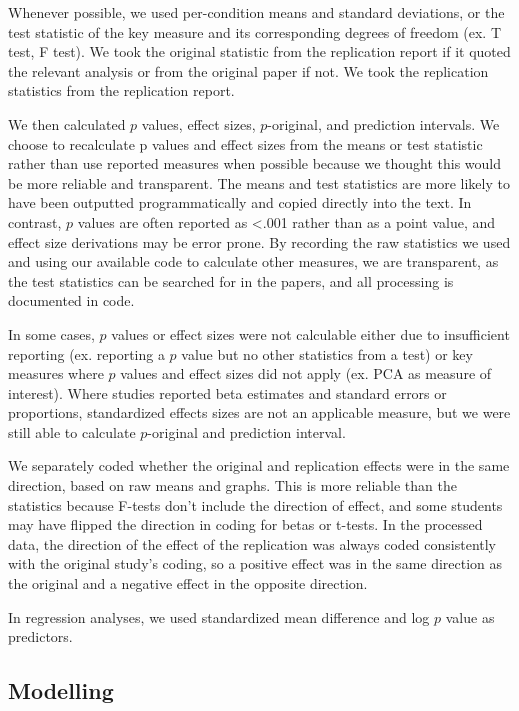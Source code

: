 \documentclass[
  english,
  a4paper,
]{article}
\begin{document}
Whenever possible, we used per-condition means and standard deviations, or the test statistic of the key measure and its corresponding degrees of freedom (ex. T test, F test). We took the original statistic from the replication report if it quoted the relevant analysis or from the original paper if not. We took the replication statistics from the replication report.

We then calculated \(p\) values, effect sizes, \(p\)-original, and prediction intervals. We choose to recalculate p values and effect sizes from the means or test statistic rather than use reported measures when possible because we thought this would be more reliable and transparent. The means and test statistics are more likely to have been outputted programmatically and copied directly into the text. In contrast, \(p\) values are often reported as \textless.001 rather than as a point value, and effect size derivations may be error prone. By recording the raw statistics we used and using our available code to calculate other measures, we are transparent, as the test statistics can be searched for in the papers, and all processing is documented in code.

In some cases, \(p\) values or effect sizes were not calculable either due to insufficient reporting (ex. reporting a \(p\) value but no other statistics from a test) or key measures where \(p\) values and effect sizes did not apply (ex. PCA as measure of interest). Where studies reported beta estimates and standard errors or proportions, standardized effects sizes are not an applicable measure, but we were still able to calculate \(p\)-original and prediction interval.

We separately coded whether the original and replication effects were in the same direction, based on raw means and graphs. This is more reliable than the statistics because F-tests don't include the direction of effect, and some students may have flipped the direction in coding for betas or t-tests. In the processed data, the direction of the effect of the replication was always coded consistently with the original study's coding, so a positive effect was in the same direction as the original and a negative effect in the opposite direction.

In regression analyses, we used standardized mean difference and log \(p\) value as predictors.

\subsection{Modelling}\label{modelling}
\end{document}
